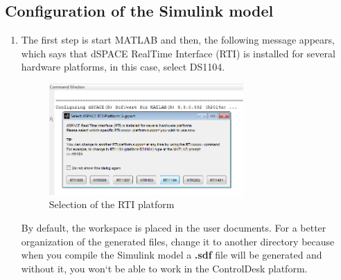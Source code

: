 \subsection{Configuration of the Simulink model}
\begin{enumerate}
    
    \item The first step is start MATLAB and then, the following message appears, which says that dSPACE RealTime Interface (RTI) is installed for several hardware platforms, in this case, select DS1104.
    \begin{figure}[H]
        \centering
        \includegraphics[width=0.7\textwidth]{Images/Ball and Bean/MatLab1.png}
        \caption{Selection of the RTI platform}
        \label{fig4}
    \end{figure}
By default, the workspace is placed in the user documents.
For a better organization of the generated files, change it to another directory because when you compile the Simulink model a \textbf{.sdf} file will be generated and without it, you won`t be able to work in the ControlDesk platform.
    

\end{enumerate}
